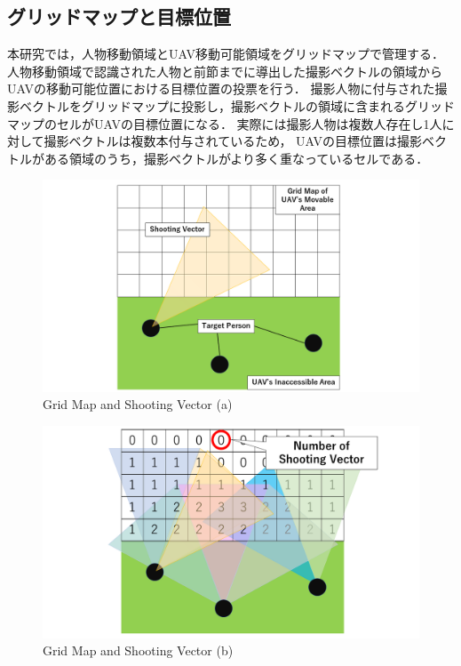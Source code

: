\documentclass[autodetect-engine,dvipdfmx-if-dvi,ja=standard,a4j,jbase=11pt,magstyle=nomag*]{bxjsreport}
\begin{document}
\subsection{グリッドマップと目標位置}
本研究では，人物移動領域とUAV移動可能領域をグリッドマップで管理する．
人物移動領域で認識された人物と前節までに導出した撮影ベクトルの領域からUAVの移動可能位置における目標位置の投票を行う．
撮影人物に付与された撮影ベクトルをグリッドマップに投影し，撮影ベクトルの領域に含まれるグリッドマップのセルがUAVの目標位置になる．
実際には撮影人物は複数人存在し1人に対して撮影ベクトルは複数本付与されているため，
UAVの目標位置は撮影ベクトルがある領域のうち，撮影ベクトルがより多く重なっているセルである．

\begin{figure}[p]
    \centering
    \includegraphics[width=\linewidth, clip]{./figure/chapter2/NSV_1.png}
    \caption{Grid Map and Shooting Vector (a)}
    \label{fig:nsv1}
\end{figure}

\begin{figure}[p]
    \centering
    \includegraphics[width=\linewidth, clip]{./figure/chapter2/NSV_2.png}
    \caption{Grid Map and Shooting Vector (b)}
    \label{fig:nsv2}
\end{figure}
\end{document}
